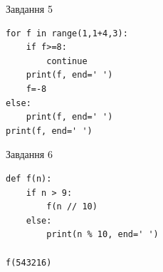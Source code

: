 \documentclass[12pt, ukrainian]{article}
\begin{document}
{\vspace{15mm}
\begin{minipage}[t]{9.7cm}                
{\begin{center}Завдання {5}\end{center}}
\begin{verbatim}
for f in range(1,1+4,3):
    if f>=8:
        continue
    print(f, end=' ')
    f=-8
else:
    print(f, end=' ')
print(f, end=' ')
\end{verbatim}     
\end{minipage}
\vline \hspace{8mm}
\begin{minipage}[t]{8.0cm}                
{\begin{center}Завдання {6}\end{center}}
\begin{verbatim}
def f(n):
    if n > 9:
        f(n // 10)
    else:
        print(n % 10, end=' ')

f(543216)
\end{verbatim}     
\end{minipage}

}
\newpage
\end{document}
